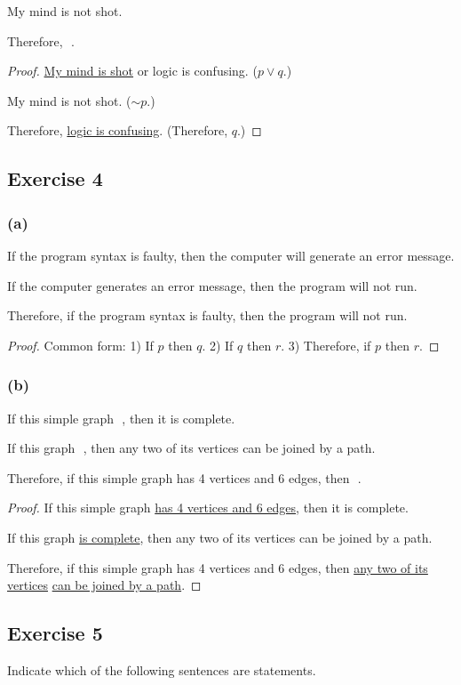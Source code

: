 \documentclass[14pt]{extarticle}
\newcommand{\fbl}{\underline{\hspace{1cm}}\,\,}
\begin{document}
My mind is not shot.

Therefore, \fbl.

\begin{proof}
    \underline{My mind is shot} or logic is confusing. ($p \vee q$.)

    My mind is not shot. ($\sim p$.)

    Therefore, \underline{logic is confusing}. (Therefore, $q$.) \end{proof}

\subsection{Exercise 4}
\subsubsection{(a)}
If the program syntax is faulty, then the computer will generate an error message.

If the computer generates an error message, then the program will not run.

Therefore, if the program syntax is faulty, then the program will not run.

\begin{proof}
    Common form: 1) If $p$ then $q$. 2) If $q$ then $r$. 3) Therefore, if $p$ then $r$.
\end{proof}

\subsubsection{(b)}
If this simple graph \fbl, then it is complete.

If this graph \fbl, then any two of its vertices can be joined by a path.

Therefore, if this simple graph has 4 vertices and 6 edges, then \fbl.

\begin{proof}
    If this simple graph \underline{has 4 vertices and 6 edges}, then it is complete.

    If this graph \underline{is complete}, then any two of its vertices can be joined by a path.

    Therefore, if this simple graph has 4 vertices and 6 edges, then \underline{any two of its vertices} \underline{can be joined by a path}.
\end{proof}

\subsection{Exercise 5}
Indicate which of the following sentences are statements.
\end{document}
